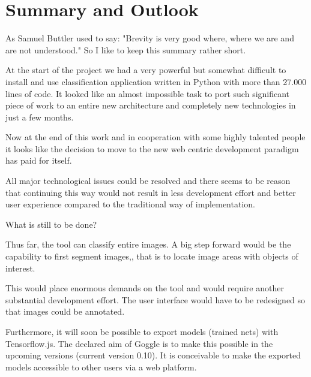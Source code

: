 \chapter{Summary and Outlook}

As Samuel Buttler used to say: "Brevity is very good where,
where we are and are not understood." So I like to keep this summary rather short.

At the start of the project we had a very powerful but
somewhat difficult to install and use classification
 application written in Python with more than 27.000 lines of code. 
It looked like
an almost impossible task to port such significant piece of
work to an entire new architecture and completely new technologies in just a few months.

Now at the end of this work and in cooperation with some 
highly talented people it looks like the decision to
 move to the new web centric development paradigm has 
 paid for itself.

All major technological issues could be resolved and there seems to be reason that continuing this way would not result in less development effort and better user experience compared to the traditional way of implementation.

What is still to be done?

Thus far, the tool can classify entire images. A big step forward would be the capability to first segment images,, that is to locate image areas with objects of interest. 

This would place enormous demands on the tool and would
require another substantial development effort. The user interface would have to be redesigned so that 
images could be annotated.  

Furthermore, it will soon be possible to export models (trained nets) with Tensorflow.js. The declared aim of Goggle is to make this possible in the upcoming versions (current version 0.10). It is conceivable to make the exported models accessible to other users via a web platform. 
